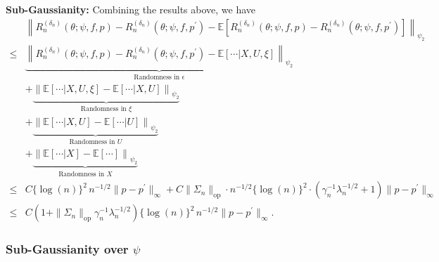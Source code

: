 \documentclass[12pt]{article}
\newcommand{\E}{\mathbb{E}}
\begin{document}
\noindent \textbf{Sub-Gaussianity:} Combining the results above, we have
\begin{align*}
    &\left\|R_n^{(\delta_n)}(\theta;\psi,f,p)-R_n^{({\delta_n})}(\theta;\psi,f,p^\prime)-\E\left[R_n^{(\delta_n)}(\theta;\psi,f,p)-R_n^{({\delta_n})}(\theta;\psi,f,p^\prime)\right]\right\|_{\psi_2}\\
    \leq & \underbrace{\left\|R_n^{(\delta_n)}(\theta;\psi,f,p)-R_n^{({\delta_n})}(\theta;\psi,f,p^\prime)-\E\left[\cdots|X,U,\xi\right]\right\|_{\psi_2}}_{\text{Randomness in $\epsilon$}}\\
    & + \underbrace{\left\|\E\left[\cdots|X,U,\xi\right]-\E\left[\cdots|X,U\right]\right\|_{\psi_2}}_{\text{Randomness in $\xi$}}\\
    & + \underbrace{\left\|\E\left[\cdots|X,U\right]-\E\left[\cdots|U\right]\right\|_{\psi_2}}_{\text{Randomness in $U$}}\\
    & + \underbrace{\left\|\E\left[\cdots|X\right]-\E\left[\cdots\right]\right\|_{\psi_2}}_{\text{Randomness in $X$}}\\
    \leq & C\{\log(n)\}^2\,n^{-1/2}\|p-p^\prime\|_\infty + C\|\Sigma_n\|_{\mathrm{op}}\cdot n^{-1/2}\{\log(n)\}^2\cdot\left(\gamma_n^{-1}\lambda_n^{-1/2}+1\right)\|p-p^\prime\|_\infty\\
    \leq & C\left(1+\|\Sigma_n\|_{\mathrm{op}}\gamma_n^{-1}\lambda_n^{-1/2}\right)\{\log(n)\}^2\,n^{-1/2}\|p-p^\prime\|_\infty.
\end{align*}


\subsubsection{Sub-Gaussianity over $\psi$}
\end{document}
